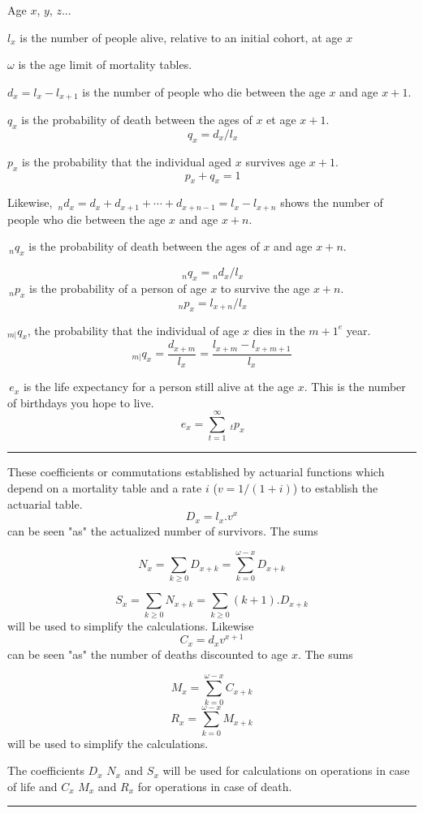 
\begin{f}

Age $x$, $y$, $z$...    

$l_x$ is the number of people alive, relative to an initial cohort, at age $x$

$\omega$ is the age limit of mortality tables.

$d_x=l_x-l_{x+1}$ is the number of people who die between the age $x$ and age $x+1$.

$q_x$ is the probability of death between the ages of $x$ et age $x+1$.
$$
\,q_x = d_x / l_x 
$$

$p_x$ is the probability that the individual aged $x$ survives age $x+1$.
$$
\,p_x+q_x=1 
$$

Likewise,
$\,_nd_x = d_x + d_{x+1} + \cdots + d_{x+n-1} = l_x - l_{x+n}$ shows the number of people who die between the age $x$ and age $x+n$.

$\,_nq_x$ is the probability of death between the ages of $x$ and age $x+n$.

$$
\,_nq_x = {}_nd_x / l_x
$$
$\,_np_x$ is the probability of a person of age $x$ to survive the age $x+n$.
$$
\,_np_x = l_{x+n} / l_x 
$$


${}_{m|}q_{x}$, the probability that the individual of age $x$ dies in the ${m+1}^e$ year.
$${}_{m|}q_{x}=\frac{d_{x+m}}{l_x}=\frac{l_{x+m}-l_{x+m+1}}{l_x}$$

$\,e_x$ is the life expectancy for a person still alive at the age $x$. 
This is the number of birthdays you hope to live.
$$
\,e_x = \sum_{t=1}^{\infty} \ _tp_x 
$$
\end{f}
\hrule

\begin{f}


These coefficients or commutations established by actuarial functions which depend on a mortality table and a rate $i$ ($v=1/(1+i)$) to establish the actuarial table.
$$
D_x=l_x .v^x
$$
can be seen "as" the actualized number of survivors. The sums

$$
N_x=\sum_{k\geq 0} D_{x+k}=\sum_{k= 0}^{\omega-x} D_{x+k}
$$

$$
S_x=\sum_{k\geq 0} N_{x+k}=\sum_{k\geq 0}(k+1). D_{x+k}
$$
will be used to simplify the calculations.
Likewise
$$
C_x = d_x v^{ x+1} 
$$
can be seen "as" the number of deaths discounted to age $x$. The sums

$$
M_x=\sum_{k= 0}^{\omega-x} C_{x+k}
$$
$$
R_x=\sum_{k= 0}^{\omega-x} M_{x+k}
$$
will be used to simplify the calculations.

The coefficients $D_x$ $N_x$ and $S_x$ will be used for calculations on operations in case of life and $C_x$ $M_x$ and $R_x$ for operations in case of death.

\end{f} 
\hrule

